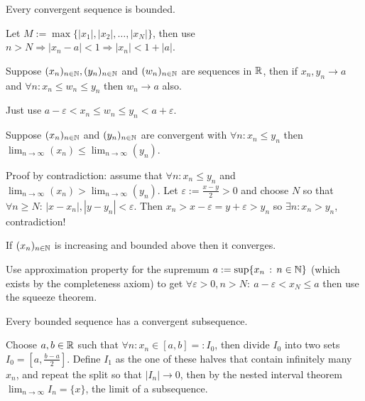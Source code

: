 \vspace{-1ex}\dotfill\vspace{-1ex}
\begin{multicols}{2}
\begin{theorem}[2.8]
Every convergent sequence is bounded.
\end{theorem}
\begin{proof1}
Let $M:=\max\{|x_1|,|x_2|,\dots,|x_N|\}$, then use $n>N\Rightarrow |x_n-a|<1 \Rightarrow |x_n|<1+|a|$.
\end{proof1}

\begin{theorem}
Suppose $(x_n)_{n\in\mathbb{N}},(y_n)_{n\in\mathbb{N}}$ and $(w_n)_{n\in\mathbb{N}}$ are sequences in $\mathbb{R}$, then if $x_n,y_n\to a$ and $\forall n: x_n\leq w_n\leq y_n$ then $w_n\to a$ also.
\end{theorem}
\begin{proof1}
Just use $a-\varepsilon<x_n\leq w_n\leq y_n<a+\varepsilon$. 
\end{proof1}

\begin{theorem}
Suppose $(x_n)_{n\in\mathbb{N}}$ and $(y_n)_{n\in\mathbb{N}}$ are convergent with $\forall n: x_n\leq y_n$ then $\lim_{n\to\infty} (x_n) \leq \lim_{n\to\infty} (y_n)$. 
\end{theorem}
\begin{proof1}
Proof by contradiction: assume that $\forall n: x_n\leq y_n$ and $\lim_{n\to\infty} (x_n) > \lim_{n\to\infty} (y_n)$. Let $\varepsilon := \frac{x-y}{2}>0$ and choose $N$ so that $\forall n\geq N:\, |x-x_n|,|y-y_n|<\varepsilon$. Then $x_n>x-\varepsilon = y+\varepsilon > y_n$ so $\exists n: x_n>y_n$, contradiction!
\end{proof1}

\begin{theorem}
If $(x_n)_{n\in\mathbb{N}}$ is increasing and bounded above then it converges.
\end{theorem}
\begin{proof1}
Use approximation property for the supremum $a:=\sup\{x_n\,:\,n\in\mathbb{N}\}$ (which exists by the completeness axiom) to get $\forall\varepsilon>0, n>N:\ a-\varepsilon < x_N \leq a$ then use the squeeze theorem.
\end{proof1}

\begin{theorem}
Every bounded sequence has a convergent subsequence.
\end{theorem}
\begin{proof1}
Choose $a,b\in\mathbb{R}$ such that $\forall n:x_n\in[a,b]=:I_0$, then divide $I_0$ into two sets $I_0=[a,\frac{b-a}{2}]$. Define $I_1$ as the one of these halves that contain infinitely many $x_n$, and repeat the split so that $|I_n|\to0$, then by the nested interval theorem $\lim_{n\to\infty} I_n = \{x\}$, the limit of a subsequence.
\end{proof1}


\end{multicols}
